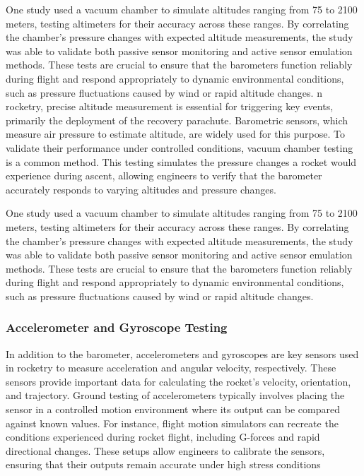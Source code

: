 One study \cite{NAR-58} used a vacuum chamber to simulate altitudes ranging from 75 to 2100 meters, testing altimeters for their accuracy across these ranges. By correlating the chamber's pressure changes with expected altitude measurements, the study was able to validate both passive sensor monitoring and active sensor emulation methods. These tests are crucial to ensure that the barometers function reliably during flight and respond appropriately to dynamic environmental conditions, such as pressure fluctuations caused by wind or rapid altitude changes.
n rocketry, precise altitude measurement is essential for triggering key events, primarily the deployment of the recovery parachute. Barometric sensors, which measure air pressure to estimate altitude, are widely used for this purpose. To validate their performance under controlled conditions, vacuum chamber testing is a common method. This testing simulates the pressure changes a rocket would experience during ascent, allowing engineers to verify that the barometer accurately responds to varying altitudes and pressure changes. 

One study used a vacuum chamber to simulate altitudes ranging from 75 to 2100 meters, testing altimeters for their accuracy across these ranges. By correlating the chamber's pressure changes with expected altitude measurements, the study was able to validate both passive sensor monitoring and active sensor emulation methods. These tests are crucial to ensure that the barometers function reliably during flight and respond appropriately to dynamic environmental conditions, such as pressure fluctuations caused by wind or rapid altitude changes.

\subsubsection{Accelerometer and Gyroscope Testing}
In addition to the barometer, accelerometers and gyroscopes are key sensors used in rocketry to measure acceleration and angular velocity, respectively. These sensors provide important data for calculating the rocket's velocity, orientation, and trajectory. Ground testing of accelerometers typically involves placing the sensor in a controlled motion environment where its output can be compared against known values. For instance, flight motion simulators can recreate the conditions experienced during rocket flight, including G-forces and rapid directional changes. These setups allow engineers to calibrate the sensors, ensuring that their outputs remain accurate under high stress conditions​  

